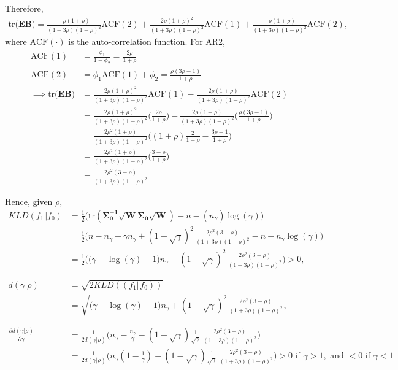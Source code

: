 \documentclass[12pt,a4paper]{article}
\begin{document}
Therefore,
\begin{align*}
\text{tr} \big( \boldsymbol{EB} \big) = \frac{-\rho (1+\rho)}{(1+3\rho)(1-\rho)^{2}} \text{ACF}(2) + \frac{2\rho (1+\rho)^2}{(1+3\rho)(1-\rho)^{2}} \text{ACF}(1) + \frac{-\rho (1+\rho)}{(1+3\rho)(1-\rho)^{2}} \text{ACF}(2),
\end{align*}
where $\text{ACF}(\cdot)$ is the auto-correlation function. For AR2,
\begin{align*}
\text{ACF}(1) &= \frac{\phi_1}{1-\phi_2} = \frac{2\rho}{1+\rho} \\
\text{ACF}(2) &= \phi_1 \text{ACF}(1) + \phi_2 = \frac{\rho(3\rho-1)}{1+\rho} \\
\implies \text{tr}\big(\boldsymbol{EB} \big) &= \frac{2\rho (1+\rho)^2}{(1+3\rho)(1-\rho)^{2}} \text{ACF}(1) - \frac{2\rho (1+\rho)}{(1+3\rho)(1-\rho)^{2}} \text{ACF}(2)\\
&=  \frac{2\rho (1+\rho)^2}{(1+3\rho)(1-\rho)^{2}} \Big(\frac{2\rho}{1+\rho}\Big) - \frac{2\rho (1+\rho)}{(1+3\rho)(1-\rho)^{2}}  \Big(\frac{\rho(3\rho-1)}{1+\rho}\Big) \\
&= \frac{2\rho^2 (1+\rho)}{(1+3\rho)(1-\rho)^{2}} \Big ( (1+\rho) \frac{2}{1+\rho} - \frac{3\rho-1}{1+\rho} \Big) \\
&= \frac{2\rho^2 (1+\rho)}{(1+3\rho)(1-\rho)^{2}}  \big( \frac{3-\rho}{1+\rho}  \big) \\
&= \frac{2\rho^2(3-\rho)}{(1+3\rho)(1-\rho)^2}
\end{align*}

Hence, given $\rho$,
\begin{align*}
KLD(f_1 \Vert f_0) &= \frac{1}{2} \Bigg( \text{tr}(\boldsymbol{\Sigma_0^{-1} \sqrt{W} \Sigma_0 \sqrt{W}}) - n - (n_{\gamma})\log(\gamma) \Bigg) \\
&= \frac{1}{2}  \bigg( n-n_{\gamma} + \gamma n_{\gamma} + (1-\sqrt{\gamma})^2 \,\frac{2\rho^2(3-\rho)}{(1+3\rho)(1-\rho)^2} - n - n_{\gamma} \log(\gamma) \bigg )\\
&= \frac{1}{2}  \bigg( \big(\gamma - \log(\gamma) - 1 \big) n_{\gamma} + (1-\sqrt{\gamma})^2 \,\frac{2\rho^2(3-\rho)}{(1+3\rho)(1-\rho)^2} \bigg) > 0,
\\
\\
\\
d(\gamma | \rho) &= \sqrt{2KLD((f_1 \Vert f_0))} \\
&= \sqrt{\big(\gamma - \log(\gamma) - 1 \big) n_{\gamma} + (1-\sqrt{\gamma})^2 \,\frac{2\rho^2(3-\rho)}{(1+3\rho)(1-\rho)^2}},
\\
\\
\\
\frac{\partial d(\gamma | \rho)}{\partial \gamma} &= \frac{1}{2	d(\gamma | \rho)} \Big( n_{\gamma} - \frac{n_{\gamma}}{\gamma} - (1-\sqrt{\gamma})\frac{1}{\sqrt{\gamma}} \,\frac{2\rho^2(3-\rho)}{(1+3\rho)(1-\rho)^2} \Big) \\
&= \frac{1}{2	d(\gamma | \rho)} \Big( n_{\gamma} ( 1 - \frac{1}{\gamma}) - (1-\sqrt{\gamma})\frac{1}{\sqrt{\gamma}} \,\frac{2\rho^2(3-\rho)}{(1+3\rho)(1-\rho)^2} \Big) > 0 \text{ if } \gamma > 1, \text{ and } < 0 \text{ if } \gamma < 1
\end{align*}
\end{document}
